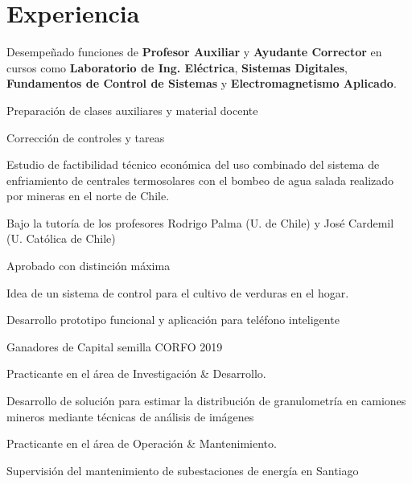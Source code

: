 \section{Experiencia \faGears}
Desempeñado funciones de \textbf{Profesor Auxiliar} y \textbf{Ayudante Corrector} en cursos como \textbf{Laboratorio de Ing. Eléctrica}, \textbf{Sistemas Digitales}, \textbf{Fundamentos de Control de Sistemas} y \textbf{Electromagnetismo Aplicado}. 
\begin{tightemize}
\item Preparación de clases auxiliares y material docente
\item Corrección de controles y tareas
\end{tightemize}
\sectionsep

Estudio de factibilidad técnico económica del uso combinado del sistema de enfriamiento de centrales termosolares con el bombeo de agua salada realizado por mineras en el norte de Chile.
\begin{tightemize}
\item Bajo la tutoría de los profesores Rodrigo Palma (U. de Chile) y José Cardemil (U. Católica de Chile)
\item Aprobado con distinción máxima
\end{tightemize}
\sectionsep

Idea de un sistema de control para el cultivo de verduras en el hogar.
\begin{tightemize}
\item Desarrollo prototipo funcional y aplicación para teléfono inteligente
\item Ganadores de Capital semilla CORFO 2019
\end{tightemize}
\sectionsep

Practicante en el área de Investigación \& Desarrollo.
\begin{tightemize}
\item Desarrollo de solución para estimar la distribución de granulometría en camiones mineros mediante técnicas de análisis de imágenes
\end{tightemize}
\sectionsep

Practicante en el área de Operación \& Mantenimiento.
\begin{tightemize}
\item Supervisión del mantenimiento de subestaciones de energía en Santiago
\end{tightemize}
\sectionsep